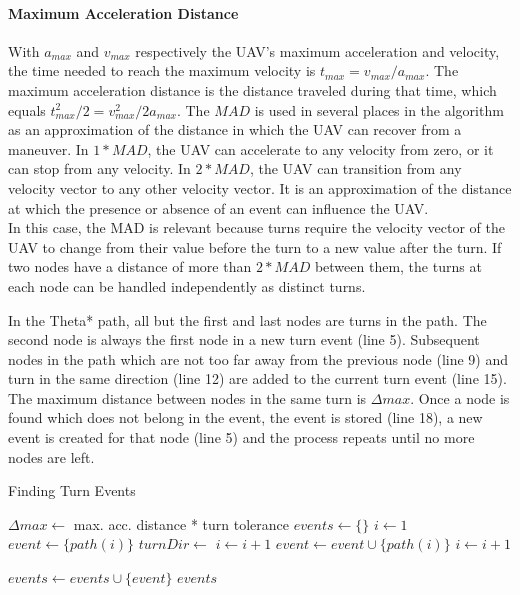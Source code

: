 \paragraph{Maximum Acceleration Distance}
With $a_{max}$ and $v_{max}$ respectively the UAV's maximum acceleration and velocity, the time needed to reach the maximum velocity is $t_{max} = v_{max} / a_{max}$. The maximum acceleration distance is the distance traveled during that time, which equals $t_{max}^2 / 2 = v_{max}^2 / 2a_{max}$. The $MAD$ is used in several places in the algorithm as an approximation of the distance in which the UAV can recover from a maneuver. In $1*MAD$, the UAV can accelerate to any velocity from zero, or it can stop from any velocity. In $2*MAD$, the UAV can transition from any velocity vector to any other velocity vector. It is an approximation of the distance at which the presence or absence of an event can influence the UAV. \\
In this case, the MAD is relevant because turns require the velocity vector of the UAV to change from their value before the turn to a new value after the turn. If two nodes have a distance of more than $2*MAD$ between them, the turns at each node can be handled independently as distinct turns. 
\par
In the Theta* path, all but the first and last nodes are turns in the path. The second node is always the first node in a new turn event (line 5). Subsequent nodes in the path which are not too far away from the previous node (line 9) and turn in the same direction (line 12) are added to the current turn event (line 15). The maximum distance between nodes in the same turn is $\Delta max$. Once a node is found which does not belong in the event, the event is stored (line 18), a new event is created for that node (line 5) and the process repeats until no more nodes are left.

\begin{algorithm}
\caption{Finding Turn Events}
\label{alg:corners}
\begin{algorithmic}[1]
  \State $\Delta max \leftarrow$ max. acc. distance * turn tolerance
  \State $events \leftarrow \{\}$ 
  \State $i \leftarrow 1$ 
   
  	\State $event \leftarrow \{ path(i) \}$ 
  	\State $turnDir \leftarrow$  
    	\State $i \leftarrow  i + 1$
    		\Break {}
	\EndIf
		\Break {}
	\EndIf
	\State $event \leftarrow event \cup \{ path(i) \}$
	\State $i \leftarrow  i + 1$
	
    	\EndWhile
    	
    	\State $events \leftarrow events \cup \{ event \}$
  \EndWhile
\Return $events$
\EndFunction
\end{algorithmic}
\end{algorithm}






